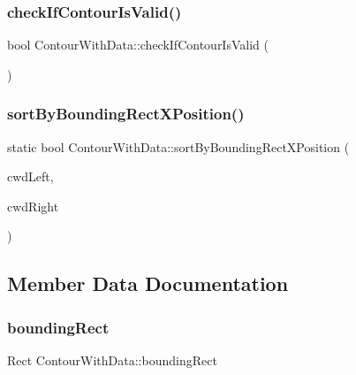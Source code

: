 \subsubsection{\texorpdfstring{check\+If\+Contour\+Is\+Valid()}{checkIfContourIsValid()}}
{\footnotesize\ttfamily bool Contour\+With\+Data\+::check\+If\+Contour\+Is\+Valid (\begin{DoxyParamCaption}{ }\end{DoxyParamCaption})}

\mbox{\label{class_contour_with_data_a467efdd6adb42badb28de1398b269d1f}} 
\subsubsection{\texorpdfstring{sort\+By\+Bounding\+Rect\+X\+Position()}{sortByBoundingRectXPosition()}}
{\footnotesize\ttfamily static bool Contour\+With\+Data\+::sort\+By\+Bounding\+Rect\+X\+Position (\begin{DoxyParamCaption}\item[{const \mbox{\hyperlink{class_contour_with_data}{Contour\+With\+Data}} \&}]{cwd\+Left,  }\item[{const \mbox{\hyperlink{class_contour_with_data}{Contour\+With\+Data}} \&}]{cwd\+Right }\end{DoxyParamCaption})\hspace{0.3cm}{\ttfamily [static]}}



\subsection{Member Data Documentation}
\mbox{\label{class_contour_with_data_aaf5dd11cc4eb24d85df816d2e730b5f3}} 
\subsubsection{\texorpdfstring{bounding\+Rect}{boundingRect}}
{\footnotesize\ttfamily Rect Contour\+With\+Data\+::bounding\+Rect}


